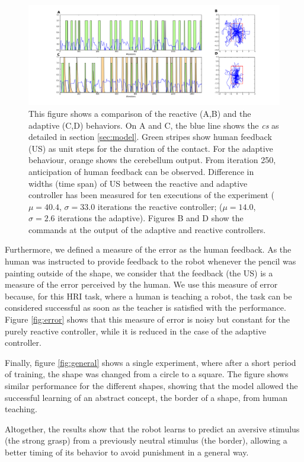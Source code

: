\documentclass[letterpaper, 10 pt, conference]{ieeeconf}  %
\begin{document}
\begin{figure}
\centering
\includegraphics[width=20cm]{reactive_adaptive}
\caption{This figure shows a comparison of the reactive (A,B) and the adaptive (C,D) behaviors. On A and C, the blue line shows the \emph{cs} as detailed in section \ref{sec:model}. Green stripes show human feedback (US) as unit steps for the duration of the contact. For the adaptive behaviour, orange shows the cerebellum output. From iteration 250, anticipation of human feedback can be observed. Difference in widths (time span) of US between the reactive and adaptive controller has been measured for ten executions of the experiment ($ \mu = 40.4 $, $ \sigma = 33.0$ iterations the reactive controller; ($ \mu = 14.0 $, $ \sigma = 2.6$ iterations the adaptive). Figures B and D show the commands at the output of the  adaptive and reactive controllers. }
\label{fig:reactive}
\end{figure}

Furthermore, we defined a measure of the error as the human feedback. As the human was instructed to provide feedback to the robot whenever the pencil was painting outside of the shape, we consider that the feedback (the US) is a measure of the error perceived by the human. We use this measure of error because, for this HRI task, where a human is teaching a robot, the task can be considered successful as soon as the teacher is satisfied with the performance. Figure \ref{fig:error} shows that this measure of error is noisy but constant for the purely reactive controller, while it is reduced in the case of the adaptive controller. 

Finally, figure \ref{fig:general} shows a single experiment, where after a short period of training, the shape was changed from a circle to a square. The figure shows similar performance for the different shapes, showing that the model allowed the successful learning of an abstract concept, the border of a shape, from human teaching. 

Altogether, the results show that the robot learns to predict an aversive stimulus (the strong grasp) from a previously neutral stimulus (the border), allowing a better timing of its behavior to avoid punishment in a general way. 
\end{document}
